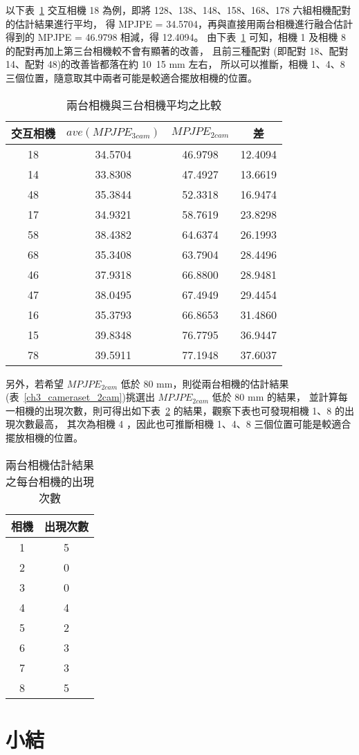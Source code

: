以下表~\ref{ch3_ave_3cam_vs_2cam} 交互相機 18 為例，即將 128、138、148、158、168、178 六組相機配對的估計結果進行平均，
得 MPJPE = 34.5704，再與直接用兩台相機進行融合估計得到的 MPJPE = 46.9798 相減，得 12.4094。
由下表~\ref{ch3_ave_3cam_vs_2cam} 可知，相機 1 及相機 8 的配對再加上第三台相機較不會有顯著的改善，
且前三種配對 (即配對 18、配對 14、配對 48)的改善皆都落在約 10~15 mm 左右，
所以可以推斷，相機 1、4、8 三個位置，隨意取其中兩者可能是較適合擺放相機的位置。
\begin{table}[!ht]
   \caption[兩台相機與三台相機平均之比較]{兩台相機與三台相機平均之比較}
   \centering
   \label{ch3_ave_3cam_vs_2cam}
   \setlength{\tabcolsep}{3pt}
   \renewcommand\arraystretch{1.5}
   \begin{tabular}{c|c|c|c}
      交互相機 & $ave(MPJPE_{3 cam})$ & $MPJPE_{2 cam}$ & 差 \\
      \midrule[2pt]
      18 & 34.5704 & 46.9798 & 12.4094 \\
      14 & 33.8308 & 47.4927 & 13.6619 \\
      48 & 35.3844 & 52.3318 & 16.9474 \\
      17 & 34.9321 & 58.7619 & 23.8298 \\ 
      58 & 38.4382 & 64.6374 & 26.1993 \\
      68 & 35.3408 & 63.7904 & 28.4496 \\
      46 & 37.9318 & 66.8800 & 28.9481 \\  
      47 & 38.0495 & 67.4949 & 29.4454 \\ 
      16 & 35.3793 & 66.8653 & 31.4860 \\ 
      15 & 39.8348 & 76.7795 & 36.9447 \\
      78 & 39.5911 & 77.1948 & 37.6037 \\
   \end{tabular}
\end{table}

另外，若希望 $MPJPE_{2 cam}$ 低於 80 mm，則從兩台相機的估計結果(表~\ref{ch3_cameraset_2cam})挑選出 $MPJPE_{2 cam}$ 低於 80 mm 的結果，
並計算每一相機的出現次數，則可得出如下表~\ref{ch3_cam_occurrence} 的結果，觀察下表也可發現相機 1、8 的出現次數最高，
其次為相機 4 ，因此也可推斷相機 1、4、8 三個位置可能是較適合擺放相機的位置。
\begin{table}[!ht]
   \caption[兩台相機估計結果之每台相機的出現次數]{兩台相機估計結果之每台相機的出現次數}
   \centering
   \label{ch3_cam_occurrence}
   \setlength{\tabcolsep}{3pt}
   \renewcommand\arraystretch{1.5}
   \begin{tabular}{c|c}
      相機 & 出現次數 \\
      \midrule[2pt]
      1 & 5 \\
      2 & 0 \\
      3 & 0 \\
      4 & 4 \\
      5 & 2 \\
      6 & 3 \\
      7 & 3 \\
      8 & 5 \\
   \end{tabular}
\end{table}

\section{小結}

\clearpage